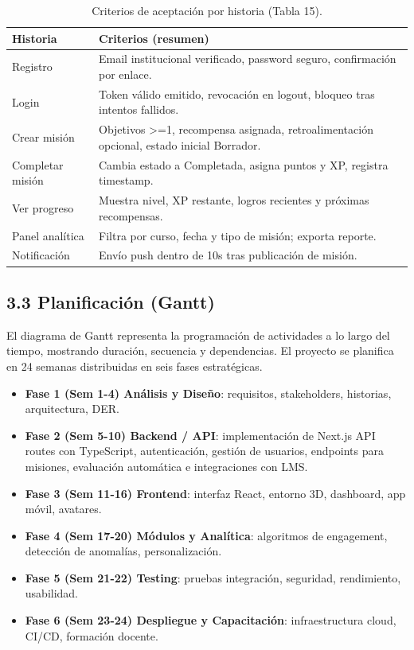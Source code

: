 \begin{table}[ht]
	\centering
	\caption{Criterios de aceptación por historia (Tabla 15).}
	\begin{tabular}{p{3.2cm} p{9.8cm}}
		\toprule
		Historia & Criterios (resumen) \\
		\midrule
		Registro & Email institucional verificado, password seguro, confirmación por enlace.\\
		Login & Token válido emitido, revocación en logout, bloqueo tras intentos fallidos.\\
		Crear misión & Objetivos >=1, recompensa asignada, retroalimentación opcional, estado inicial Borrador.\\
		Completar misión & Cambia estado a Completada, asigna puntos y XP, registra timestamp.\\
		Ver progreso & Muestra nivel, XP restante, logros recientes y próximas recompensas.\\
		Panel analítica & Filtra por curso, fecha y tipo de misión; exporta reporte.\\
		Notificación & Envío push dentro de 10s tras publicación de misión.\\
		\bottomrule
	\end{tabular}
\end{table}

\subsection{3.3 Planificación (Gantt)}
El diagrama de Gantt representa la programación de actividades a lo largo del tiempo, mostrando duración, secuencia y dependencias. El proyecto se planifica en 24 semanas distribuidas en seis fases estratégicas.
\begin{itemize}
	\item \textbf{Fase 1 (Sem 1-4) Análisis y Diseño}: requisitos, stakeholders, historias, arquitectura, DER.
		\item \textbf{Fase 2 (Sem 5-10) Backend / API}: implementación de Next.js API routes con TypeScript, autenticación, gestión de usuarios, endpoints para misiones, evaluación automática e integraciones con LMS.
	\item \textbf{Fase 3 (Sem 11-16) Frontend}: interfaz React, entorno 3D, dashboard, app móvil, avatares.
	\item \textbf{Fase 4 (Sem 17-20) Módulos y Analítica}: algoritmos de engagement, detección de anomalías, personalización.
	\item \textbf{Fase 5 (Sem 21-22) Testing}: pruebas integración, seguridad, rendimiento, usabilidad.
	\item \textbf{Fase 6 (Sem 23-24) Despliegue y Capacitación}: infraestructura cloud, CI/CD, formación docente.
\end{itemize}

